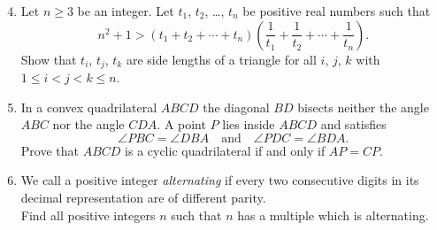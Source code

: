 \documentclass[12pt]{article}
\begin{document}
\vspace*{.3in}

\begin{enumerate}
\setcounter{enumi}{3}
\item
Let $n\ge 3$ be an integer. Let $t_1$, $t_2$, \dots, $t_n$ be positive 
real numbers such that
\[
n^2+1 > (t_1 + t_2 + \cdots + t_n)
\left(\frac{1}{t_1} + \frac{1}{t_2} + \cdots + \frac{1}{t_n}\right).
\]
Show that $t_i$, $t_j$, $t_k$ are side lengths of a triangle for all $i$, 
$j$, $k$ with $1\le i < j <k \le n$.

\item
In a convex quadrilateral $ABCD$ the diagonal $BD$
bisects neither the angle $ABC$ nor the angle $CDA$.
A point $P$ lies inside $ABCD$ and satisfies
\[
\angle PBC = \angle DBA\quad\textrm{and}\quad \angle PDC = \angle BDA.
\]
Prove that $ABCD$ is a cyclic quadrilateral if and only if $AP=CP$.

\item
We call a positive integer \emph{alternating} if every two consecutive 
digits in its decimal representation are of different parity.\\
Find all positive integers $n$ such that $n$ has a multiple which is 
alternating. 
\end{enumerate}
\end{document}
